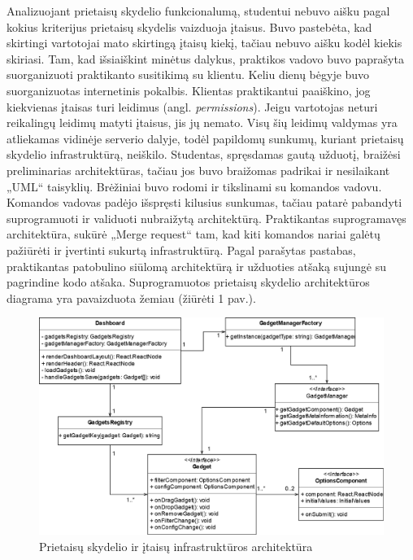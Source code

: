 \documentclass{VUMIFPSbakalaurinis}
\begin{document}
Analizuojant prietaisų skydelio funkcionalumą, studentui nebuvo aišku pagal kokius kriterijus prietaisų skydelis vaizduoja įtaisus. Buvo pastebėta, kad skirtingi vartotojai mato skirtingą įtaisų kiekį, tačiau nebuvo aišku kodėl kiekis skiriasi. Tam, kad išsiaiškint minėtus dalykus, praktikos vadovo buvo paprašyta suorganizuoti praktikanto susitikimą su klientu. Keliu dienų bėgyje buvo suorganizuotas internetinis pokalbis. Klientas praktikantui paaiškino, jog kiekvienas įtaisas turi leidimus (angl. \textit{permissions}). Jeigu vartotojas neturi reikalingų leidimų matyti įtaisus, jis jų nemato. Visų šių leidimų valdymas yra atliekamas vidinėje serverio dalyje, todėl papildomų sunkumų, kuriant prietaisų skydelio infrastruktūrą, neiškilo. Studentas, spręsdamas gautą užduotį, braižėsi preliminarias architektūras, tačiau jos buvo braižomas padrikai ir nesilaikant „UML“ taisyklių. Brėžiniai buvo rodomi ir tikslinami su komandos vadovu. Komandos vadovas padėjo išspręsti kilusius sunkumas, tačiau patarė pabandyti suprogramuoti ir validuoti nubraižytą architektūrą. Praktikantas suprogramavęs architektūra, sukūrė „Merge request“ tam, kad kiti komandos nariai galėtų pažiūrėti ir įvertinti sukurtą infrastruktūrą. Pagal parašytas pastabas, praktikantas patobulino siūlomą architektūrą ir užduoties atšaką sujungė su pagrindine kodo atšaka. Suprogramuotos prietaisų skydelio architektūros diagrama yra pavaizduota žemiau (žiūrėti 1 pav.).


\begin{figure}[H]
    \centering
    \includegraphics[scale=0.45]{images/gadgets}
    \caption{Prietaisų skydelio ir įtaisų infrastruktūros architektūra} 
\end{figure}
\end{document}
